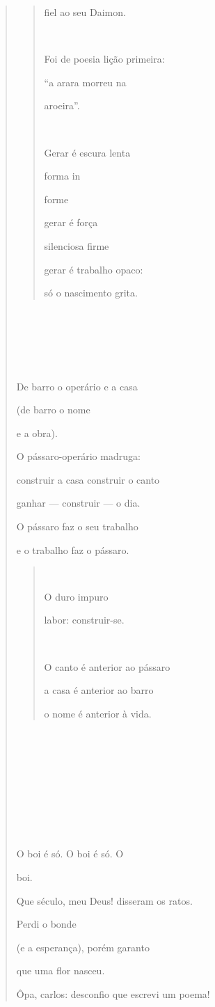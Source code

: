 \begin{verse}
\begin{quote}
fiel ao seu Daimon.



Foi de poesia lição primeira:

``a arara morreu na

aroeira''.



Gerar é escura lenta

forma in

forme

gerar é força

silenciosa firme

gerar é trabalho opaco:

só o nascimento grita.
\end{quote}







De barro o operário e a casa

(de barro o nome

e a obra).

O pássaro-operário madruga:

construir a casa construir o canto

ganhar --- construir --- o dia.

O pássaro faz o seu trabalho

e o trabalho faz o pássaro.

\begin{quote}


O duro impuro

labor: construir-se.



O canto é anterior ao pássaro

a casa é anterior ao barro

o nome é anterior à vida.
\end{quote}









 

O boi é só. O boi é só. O

boi.

Que século, meu Deus! disseram os ratos.

Perdi o bonde

(e a esperança), porém garanto

que uma flor nasceu.

Ôpa, carlos: desconfio que escrevi um poema!


\end{verse}
